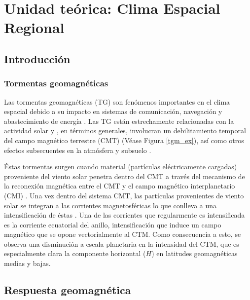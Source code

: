 \chapter{Unidad teórica: Clima Espacial Regional}

\section{Introducción}

\subsection{Tormentas geomagnéticas}

Las tormentas geomagnéticas (TG) son fenómenos importantes en el clima espacial debido a su impacto en sistemas de comunicación, navegación y abastecimiento de energía \cite{schrijver2015}. Las TG están estrechamente relacionadas con la actividad solar y , en términos generales, involucran un debilitamiento temporal del campo magnético terrestre (CMT) (Véase Figura \ref{tgm_ex}), así como otros efectos subsecuentes en la atmósfera y subsuelo \parencite{gonzalestgm}. 
\vspace{1 em}

Éstas tormentas surgen cuando material (partículas eléctricamente cargadas) proveniente del viento solar penetra dentro del CMT a través del mecanismo de la reconexión magnética entre el CMT y el campo magnético interplanetario (CMI) \parencite{l_basic_spaceplasmaphysic, l_russell}. Una vez dentro del sistema CMT, las partículas provenientes de viento solar se integran a las corrientes magnetosféricas lo que conlleva a una intensificación de éstas \parencite{l_basic_spaceplasmaphysic}. Una de las corrientes que regularmente es intensificada es la corriente ecuatorial del anillo, intensificación que induce un campo magnético que se opone vectorialmente al CTM. Como consecuencia a esto, se observa una disminución a escala planetaria en la intensidad del CTM, que es especialmente clara la componente horizontal ($H$) en latitudes geomagnéticas medias y bajas.
\vspace{ 1 em}

\section{Respuesta geomagnética}

